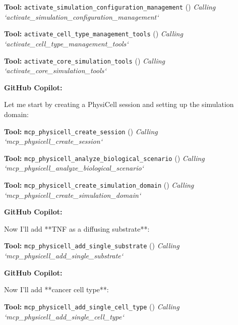\documentclass[11pt,a4paper]{article}
\begin{document}
\begin{toolokbox}
\textbf{Tool:} \texttt{activate\_simulation\_configuration\_management} (\checkmark)
\textit{Calling `activate\_simulation\_configuration\_management`}
\end{toolokbox}
\begin{toolokbox}
\textbf{Tool:} \texttt{activate\_cell\_type\_management\_tools} (\checkmark)
\textit{Calling `activate\_cell\_type\_management\_tools`}
\end{toolokbox}
\begin{toolokbox}
\textbf{Tool:} \texttt{activate\_core\_simulation\_tools} (\checkmark)
\textit{Calling `activate\_core\_simulation\_tools`}
\end{toolokbox}
\begin{copilotbox}
\textbf{GitHub Copilot:}

Let me start by creating a PhysiCell session and setting up the simulation domain:

\end{copilotbox}
\begin{toolokbox}
\textbf{Tool:} \texttt{mcp\_physicell\_create\_session} (\checkmark)
\textit{Calling `mcp\_physicell\_create\_session`}
\end{toolokbox}
\begin{toolokbox}
\textbf{Tool:} \texttt{mcp\_physicell\_analyze\_biological\_scenario} (\checkmark)
\textit{Calling `mcp\_physicell\_analyze\_biological\_scenario`}
\end{toolokbox}
\begin{toolokbox}
\textbf{Tool:} \texttt{mcp\_physicell\_create\_simulation\_domain} (\checkmark)
\textit{Calling `mcp\_physicell\_create\_simulation\_domain`}
\end{toolokbox}
\begin{copilotbox}
\textbf{GitHub Copilot:}

Now I'll add **TNF as a diffusing substrate**:

\end{copilotbox}
\begin{toolokbox}
\textbf{Tool:} \texttt{mcp\_physicell\_add\_single\_substrate} (\checkmark)
\textit{Calling `mcp\_physicell\_add\_single\_substrate`}
\end{toolokbox}
\begin{copilotbox}
\textbf{GitHub Copilot:}

Now I'll add **cancer cell type**:

\end{copilotbox}
\begin{toolokbox}
\textbf{Tool:} \texttt{mcp\_physicell\_add\_single\_cell\_type} (\checkmark)
\textit{Calling `mcp\_physicell\_add\_single\_cell\_type`}
\end{toolokbox}
\end{document}
